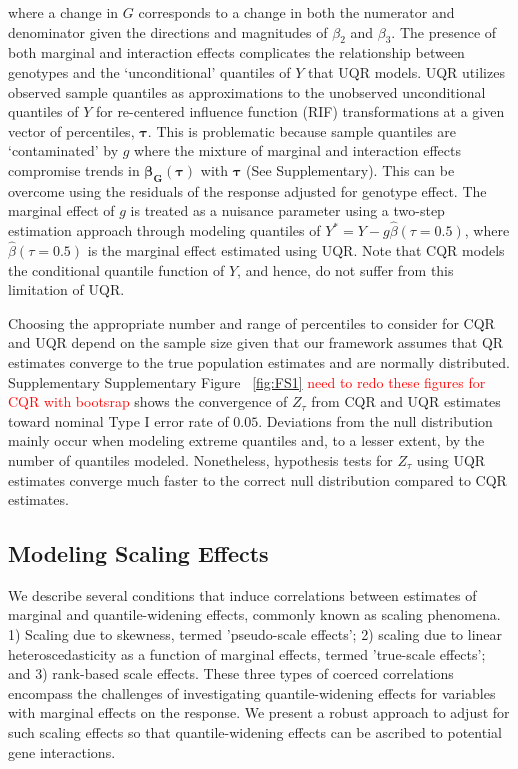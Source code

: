 \documentclass[12pt]{article}
\begin{document}
\begin{appendices}
\begin{equation}
\end{equation}
where a change in $G$ corresponds to a change in both the numerator and denominator given the directions and magnitudes of $\beta_2$ and $\beta_3$. The presence of both marginal and interaction effects complicates the relationship between genotypes and the `unconditional' quantiles of $Y$ that UQR models. UQR utilizes observed sample quantiles as approximations to the unobserved unconditional quantiles of $Y$ for re-centered influence function (RIF) transformations at a given vector of percentiles, $\bm{\tau}$. This is problematic because sample quantiles are `contaminated' by $g$ where the mixture of marginal and interaction effects compromise trends in $\bm{\beta_G (\tau)}$ with $\bm{\tau}$ (See Supplementary). This can be overcome using the residuals of the response adjusted for genotype effect. The marginal effect of $g$ is treated as a nuisance parameter using a two-step estimation approach through modeling quantiles of $Y^* = Y - g\widehat{\beta}(\tau=0.5)$, where $\widehat{\beta}(\tau=0.5)$ is the marginal effect estimated using UQR. Note that CQR models the conditional quantile function of $Y$, and hence, do not suffer from this limitation of UQR. 

Choosing the appropriate number and range of percentiles to consider for CQR and UQR depend on the sample size given that our framework assumes that QR estimates converge to the true population estimates and are normally distributed. Supplementary Supplementary Figure ~\ref{fig:FS1} \textcolor{red}{need to redo these figures for CQR with bootsrap} shows the convergence of $Z_{\tau}$ from CQR and UQR estimates toward nominal Type I error rate of $0.05$. Deviations from the null distribution mainly occur when modeling extreme quantiles and, to a lesser extent, by the number of quantiles modeled. Nonetheless, hypothesis tests for $Z_{\tau}$ using UQR estimates converge much faster to the correct null distribution compared to CQR estimates. 

\subsection{Modeling Scaling Effects}
\indent \indent We describe several conditions that induce correlations between estimates of marginal and quantile-widening effects, commonly known as scaling phenomena. 1) Scaling due to skewness, termed 'pseudo-scale effects'; 2) scaling due to linear heteroscedasticity as a function of marginal effects, termed 'true-scale effects'; and 3) rank-based scale effects. These three types of coerced correlations encompass the challenges of investigating  quantile-widening effects for variables with marginal effects on the response. We present a robust approach to adjust for such scaling effects so that quantile-widening effects can be ascribed to potential gene interactions. 


\end{appendices}
\end{document}
